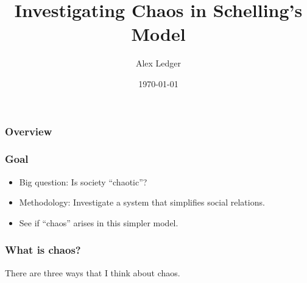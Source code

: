 \documentclass[11pt, handout]{beamer}
\title[Short title]{Investigating Chaos in Schelling's Model} %
\author{Alex Ledger} %
\institute[Reed College] %
{
Reed College \\ %
\medskip
\textit{aledger@reed.edu}%
}
\date{\today} %
\begin{document}
\begin{frame}
\titlepage 
\end{frame}

\begin{frame}
\frametitle{Overview} 
\end{frame}

\begin{frame}
    \frametitle{Goal}
    \begin{itemize}
        \item Big question: Is society ``chaotic''?
        \item Methodology: Investigate a system that simplifies social relations. 
        \item See if ``chaos'' arises in this simpler model.
    \end{itemize}
\end{frame}

\begin{frame}
    \frametitle{What is chaos?}
    There are three ways that I think about chaos.
\end{frame}
\end{document}
